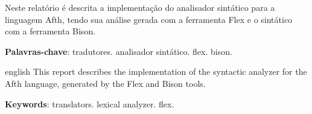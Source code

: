 \documentclass[
	article,			%
	11pt,				%
	oneside,			%
	a4paper,			%
	english,			%
	brazil,				%
	sumario=tradicional
	]{abntex2}
\begin{document}

\frenchspacing 


%
%

\maketitle





\begin{resumoumacoluna}
	Neste relatório é descrita a implementação do analisador sintático
	para a linguagem Afth, tendo sua análise gerada com a ferramenta
	Flex e o sintático com a ferramenta Bison.

	\vspace{\onelineskip}
	 
	\noindent
	\textbf{Palavras-chave}: tradutores. analisador sintático. flex. bison.
\end{resumoumacoluna}


\renewcommand{\resumoname}{Abstract}
\begin{resumoumacoluna}
	\begin{otherlanguage*}{english}
		This report describes the implementation of the syntactic
		analyzer for the Afth language, generated by the Flex and Bison tools.

		\vspace{\onelineskip}
		 
		\noindent
		\textbf{Keywords}: translators. lexical analyzer. flex.
	\end{otherlanguage*}  
\end{resumoumacoluna}


\begin{center}\smaller
	
	
\end{center}
\end{document}
